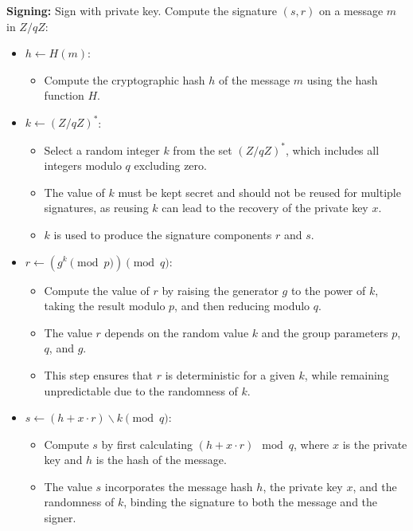 \textbf{Signing:} Sign with private key. Compute the signature $(s, r)$ on a message $m$ in $Z/qZ$:
\begin{itemize}
    \item $h \leftarrow H(m)$:
    \begin{itemize}
        \item Compute the cryptographic hash $h$ of the message $m$ using the hash function $H$.
    \end{itemize}
    \item $k \leftarrow (Z/qZ)^*$:
    \begin{itemize}
        \item Select a random integer $k$ from the set $(Z/qZ)^*$, which includes all integers modulo $q$ excluding zero.
        \item The value of $k$ must be kept secret and should not be reused for multiple signatures, as reusing $k$ can lead to the recovery of the private key $x$.
        \item $k$ is used to produce the signature components $r$ and $s$. 
    \end{itemize}
    \item $r \leftarrow (g^k \pmod{p}) \pmod{q}$:
    \begin{itemize}
        \item Compute the value of $r$ by raising the generator $g$ to the power of $k$, taking the result modulo $p$, and then reducing modulo $q$.
        \item The value $r$ depends on the random value $k$ and the group parameters $p$, $q$, and $g$.
        \item This step ensures that $r$ is deterministic for a given $k$, while remaining unpredictable due to the randomness of $k$.
    \end{itemize}
    \item $s \leftarrow (h + x \cdot r) \backslash k \pmod{q}$:
    \begin{itemize}
        \item Compute $s$ by first calculating $(h + x \cdot r) \mod q$, where $x$ is the private key and $h$ is the hash of the message.
        \item The value $s$ incorporates the message hash $h$, the private key $x$, and the randomness of $k$, binding the signature to both the message and the signer.
    \end{itemize}
\end{itemize}

